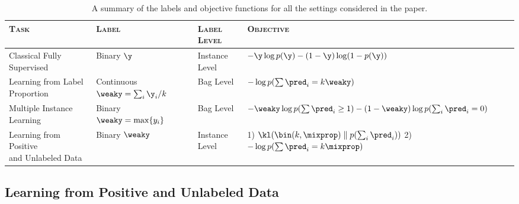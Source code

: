 \documentclass{article}
\begin{document}
\begin{table}[t]
\caption{A summary of the labels and objective functions for all the settings considered in the paper.}
\centering
\renewcommand{\arraystretch}{1.5}
\begin{adjustbox}{max width=\textwidth}
\begin{tabular}[t]{llll}
\toprule
\textbf{\textsc{Task}} & \textbf{\textsc{Label}}& 
\textbf{\textsc{Label Level}} & \textbf{\textsc{Objective}}
\\
\midrule
Classical Fully Supervised & Binary $\y$ & Instance Level & $-\y \log p(\y) - (1 - \y) \log (1 - p(\y))$ \\
Learning from Label Proportion & Continuous $\weaky = \sum_i \y_i / k$ & Bag Level & $- \log p(\sum \pred_i = k \weaky)$ \\
Multiple Instance Learning & Binary $\weaky = \max \{ y_i \}$ &  Bag Level & 
\makecell[l]{
$-\weaky \log p(\sum \pred_i \geq 1) - (1 - \weaky) \log p(\sum_i \pred_i = 0)$\\
}\\
\makecell[l]{Learning from Positive \\and Unlabeled Data}
& Binary $\weaky$ & Instance Level &  
\makecell[l]{
1) $\kl(\bin(k, \mixprop) \parallel p(\sum_i \pred_i))$ \\ 
2) $- \log p(\sum \pred_i = k \mixprop)$
} \\
\bottomrule
\end{tabular}
\end{adjustbox}
\label{tb: task comparison}
\end{table}

\subsection{Learning from Positive and Unlabeled Data}
\label{sec: PU intro}
\end{document}
